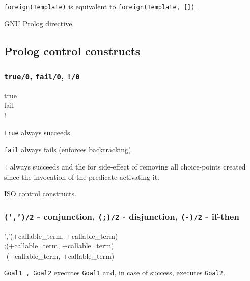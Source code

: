 \texttt{foreign(Template)} is equivalent to \texttt{foreign(Template, [])}.

\Portability

GNU Prolog directive.

\subsection{Prolog control constructs}

\subsubsection{\texttt{true/0},
               \texttt{fail/0},
               \texttt{!/0}}
\label{true/0}

\begin{TemplatesOneCol}
true\\
fail\\
!

\end{TemplatesOneCol}

\Description

\texttt{true} always succeeds.

\texttt{fail} always fails (enforces backtracking).

\texttt{!} always succeeds and the for side-effect of removing all
choice-points created since the invocation of the predicate activating it.

\PlErrorsNone

\Portability

ISO control constructs.

\subsubsection{\texttt{(',')/2} - conjunction,
               \texttt{(;)/2} - disjunction,
               \texttt{(-{\gt})/2} - if-then}

\begin{TemplatesOneCol}
','(+callable\_term, +callable\_term)\\
;(+callable\_term, +callable\_term)\\
-{\gt}(+callable\_term, +callable\_term)

\end{TemplatesOneCol}

\Description

\texttt{Goal1 , Goal2} executes \texttt{Goal1} and, in case of
success, executes \texttt{Goal2}.

